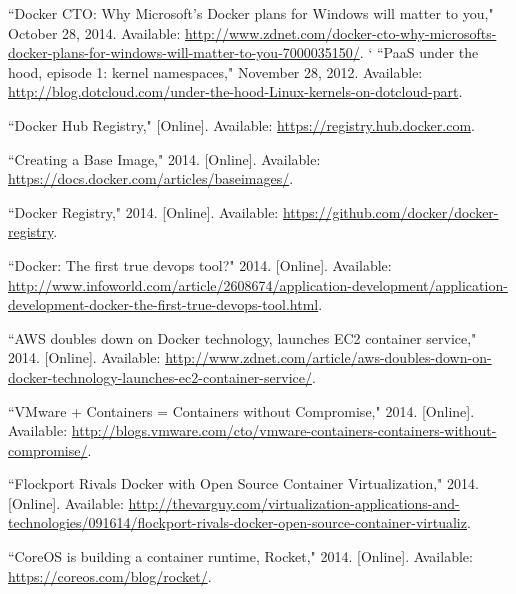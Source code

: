 
\begin{thebibliography}{99}
\begin{singlespace}
\raggedright

``Docker CTO: Why Microsoft's Docker plans for Windows will matter to you," October 28, 2014. Available: \url{http://www.zdnet.com/docker-cto-why-microsofts-docker-plans-for-windows-will-matter-to-you-7000035150/}.
`
``PaaS under the hood, episode 1: kernel namespaces," November 28, 2012. Available: \url{http://blog.dotcloud.com/under-the-hood-Linux-kernels-on-dotcloud-part}.

``Docker Hub Registry," [Online]. Available: \url{https://registry.hub.docker.com}.

``Creating a Base Image," 2014. [Online]. Available: \url{https://docs.docker.com/articles/baseimages/}.

``Docker Registry," 2014. [Online]. Available: \url{https://github.com/docker/docker-registry}.

``Docker: The first true devops tool?" 2014. [Online]. Available: \url{http://www.infoworld.com/article/2608674/application-development/application-development-docker-the-first-true-devops-tool.html}.

``AWS doubles down on Docker technology, launches EC2 container service," 2014. [Online]. Available: \url{http://www.zdnet.com/article/aws-doubles-down-on-docker-technology-launches-ec2-container-service/}.

``VMware + Containers = Containers without Compromise," 2014. [Online]. Available: \url{http://blogs.vmware.com/cto/vmware-containers-containers-without-compromise/}.

``Flockport Rivals Docker with Open Source Container Virtualization," 2014. [Online]. Available: \url{http://thevarguy.com/virtualization-applications-and-technologies/091614/flockport-rivals-docker-open-source-container-virtualiz}.

``CoreOS is building a container runtime, Rocket," 2014. [Online]. Available: \url{https://coreos.com/blog/rocket/}.


\end{singlespace}
\end{thebibliography}
